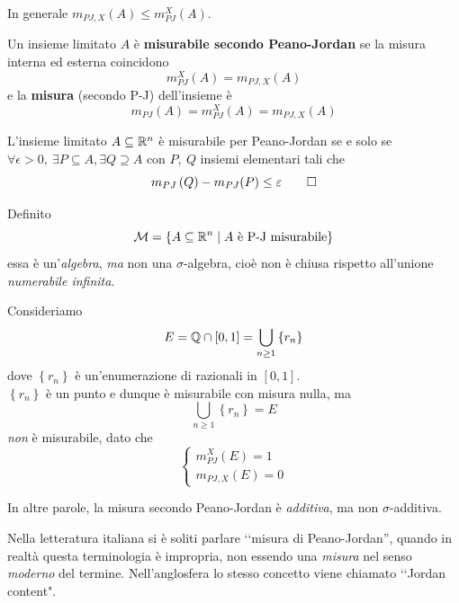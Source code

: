 	In generale $m_{PJ,X}\left(A\right)\leq m_{PJ}^{X}\left(A\right)$.
	\begin{define}
		Un insieme limitato $A$ è \textbf{misurabile secondo Peano-Jordan} se la misura interna ed esterna coincidono
		\begin{equation}
			m_{PJ}^X\left(A\right)=m_{PJ,X}\left(A\right)
		\end{equation}
	e la \textbf{misura} (secondo P-J) dell'insieme è
		\begin{equation}
			m_{PJ}\left(A\right)=m_{PJ}^X\left(A\right)=m_{PJ,X}\left(A\right)
		\end{equation}
	\end{define}
	\begin{propositionqed}
		L'insieme limitato $A\subseteq \realset^n$ è misurabile per Peano-Jordan se e solo se $\forall \epsilon>0,\ \exists P\subseteq A, \exists Q\supseteq A$ con $P,\ Q$ insiemi elementari tali che
		\begin{equation}
			m_{PJ}\left(Q\right)-m_{PJ}(P)\leq \epsilon\qedhere
		\end{equation}
	\end{propositionqed}
	Definito
	\begin{equation}
		\mathcal{M}=\left\{A\subseteq \realset^n\mid A\text{ è P-J misurabile}\right\}
	\end{equation}
	essa è un'\textit{algebra}, \textit{ma} non una $\sigma$-algebra, cioè non è chiusa rispetto all'unione \textit{numerabile infinita}.
	\begin{examplewt}
		Consideriamo
		\begin{equation*}
			E=\rationalset\cap\left[0,1\right]=\bigcup_{n\geq 1}\left\{r_n\right\}
		\end{equation*}
		dove $\left\{r_n\right\}$ è un'enumerazione di razionali in $\left[0,1\right]$.\\
		$\left\{r_n\right\}$ è un punto e dunque è misurabile con misura nulla, ma \begin{equation*}
			\bigcup_{n\geq 1}\left\{r_n\right\}=E
		\end{equation*}
		\textit{non} è misurabile, dato che
		\begin{equation*}
			\begin{cases}
				m_{PJ}^X(E)=1\\
				m_{PJ,X}(E)=0
			\end{cases}
		\end{equation*}
	\end{examplewt}
	In altre parole, la misura secondo Peano-Jordan è \textit{additiva}, ma non $\sigma$-additiva.
	\begin{digression}
		Nella letteratura italiana si è soliti parlare ‘‘misura di Peano-Jordan'', quando in realtà questa terminologia è impropria, non essendo una \textit{misura} nel senso \textit{moderno} del termine. Nell'anglosfera lo stesso concetto viene chiamato ‘‘Jordan content".
	\end{digression}
